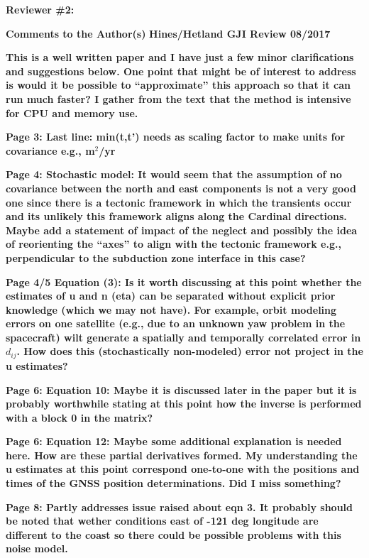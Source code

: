 \documentclass[10pt,a4paper]{letter}
\begin{document}
\begin{letter}{}

\textbf{Reviewer \#2:}\newline

\textbf{Comments to the Author(s)}
\textbf{Hines/Hetland GJI Review 08/2017}

\textbf{This is a well written paper and I have just a few minor
clarifications and suggestions below.  One point that might be of
interest to address is would it be possible to “approximate” this
approach so that it can run much faster?  I gather from the text that
the method is intensive for CPU and memory use.}

\textbf{Page 3: Last line: min(t,t’) needs as scaling factor to make units for
covariance e.g., m$^2$/yr}

\textbf{Page 4: Stochastic model: It would seem that the assumption of no
covariance between the north and east components is not a very good
one since there is a tectonic framework in which the transients occur
and its unlikely this framework aligns along the Cardinal directions.
Maybe add a statement of impact of the neglect and possibly the idea
of reorienting the “axes” to align with the tectonic framework e.g.,
perpendicular to the subduction zone interface in this case?}

\textbf{Page 4/5 Equation (3): Is it worth discussing at this point whether
the estimates of u and n (eta) can be separated without explicit prior
knowledge (which we may not have).  For example, orbit modeling errors
on one satellite (e.g., due to an unknown yaw problem in the
spacecraft) wilt generate a spatially and temporally correlated error
in $d_{ij}$.  How does this (stochastically non-modeled) error not project
in the u estimates?}

\textbf{Page 6: Equation 10: Maybe it is discussed later in the paper but it
is probably worthwhile stating at this point how the inverse is
performed with a block 0 in the matrix?}

\textbf{Page 6: Equation 12: Maybe some additional explanation is needed here.
How are these partial derivatives formed.  My understanding the u
estimates at this point correspond one-to-one with the positions and
times of the GNSS position determinations.  Did I miss something?}

\textbf{Page 8: Partly addresses issue raised about eqn 3.  It probably should
be noted that wether conditions east of -121 deg longitude are
different to the coast so there could be possible problems with this
noise model.}


\end{letter}
\end{document}
